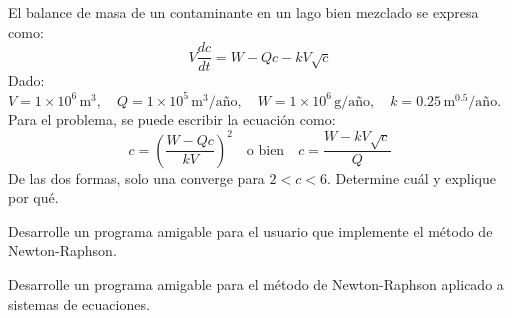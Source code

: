 \documentclass[12pt,letterpaper]{article}
\theoremstyle{definition}
\theoremstyle{plain}
\theoremstyle{remark}
\begin{document}
\begin{multicols}{2}
{\problem\label{p:2} El balance de masa de un contaminante en un lago bien mezclado se expresa como:
\[
V \frac{dc}{dt} = W - Qc - kV\sqrt{c}
\]
Dado:
\(
V = 1 \times 10^6 \, \text{m}^3,\quad Q = 1 \times 10^5 \, \text{m}^3/\text{año},\quad W = 1 \times 10^6 \, \text{g}/\text{año},\quad k = 0.25 \, \text{m}^{0.5}/\text{año}
\). 
Para el problema, se puede escribir la ecuación como:
\[
c = \left( \frac{W - Qc}{kV} \right)^2 \quad \text{o bien} \quad c = \frac{W - kV\sqrt{c}}{Q}
\]
De las dos formas, solo una converge para $2 < c < 6$. Determine cuál y explique por qué.}

{\problem Desarrolle un programa amigable para el usuario que implemente el método de Newton-Raphson.}

{\problem Desarrolle un programa amigable para el método de Newton-Raphson aplicado a sistemas de ecuaciones.}

\end{multicols}
\end{document}

